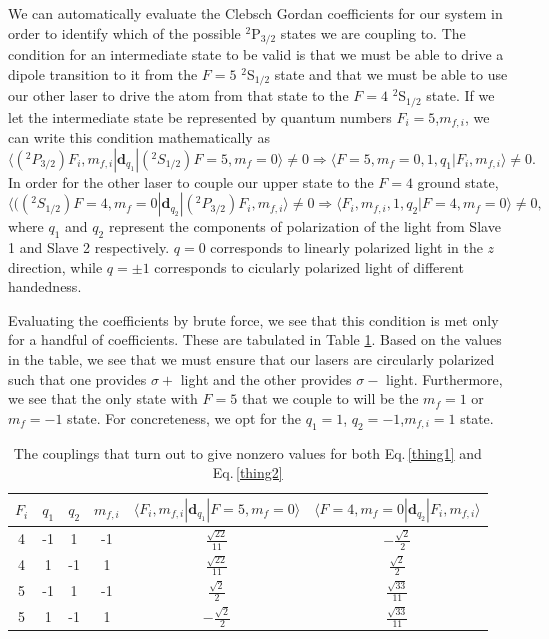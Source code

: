 We can automatically evaluate the Clebsch Gordan coefficients for our system in order to identify which of the possible $^2$P$_{3/2}$ states we are coupling to. The condition for an intermediate state to be valid is that we must be able to drive a dipole transition to it from the $F=5$ $^2$S$_{1/2}$ state and that we must be able to use our other laser to drive the atom from that state to the $F=4$ $^2$S$_{1/2}$ state. If we let the intermediate state be represented by quantum numbers $F_i=5$,$m_{f,i}$, we can write this condition mathematically as  
\begin{equation}
\langle (^2P_{3/2}) F_i,m_{f,i}|\mathbf{d}_{q_1}|(^2S_{1/2})F=5,m_f=0\rangle\neq 0 \Rightarrow \langle F=5,m_f=0,1,q_1|F_i,m_{f,i}\rangle \neq 0  \label{thing1}.
\end{equation}
In order for the other laser to couple our upper state to the $F=4$ ground state, 
\begin{equation}
\langle ((^2S_{1/2})F=4,m_f=0|\mathbf{d}_{q_2}|(^2P_{3/2}) F_i,m_{f,i}\rangle\neq 0 \Rightarrow \langle F_i,m_{f,i},1,q_2|F=4,m_f=0 \rangle \neq 0 \label{thing2},
\end{equation}
where $q_1$ and $q_2$ represent the components of polarization of the light from Slave 1 and Slave 2 respectively. $q=0$ corresponds to linearly polarized light in the $z$ direction, while $q=\pm 1$ corresponds to cicularly polarized light of different handedness.

Evaluating the coefficients by brute force, we see that this condition is met only for a handful of coefficients. These are tabulated in Table \ref{nonzeroCG}. Based on the values in the table, we see that we must ensure that our lasers are circularly polarized such that one provides $\sigma+$ light and the other provides $\sigma-$ light. Furthermore, we see that the only state with $F=5$ that we couple to will be the $m_f=1$ or $m_f=-1$ state. For concreteness, we opt for the $q_1=1$, $q_2=-1$,$m_{f,i}=1$ state. 

\begin{table}[h!]
\centering
\begin{tabular}{|c|c|c|c|c|c|}
$F_i$ & $q_1$ & $q_2$ & $m_{f,i}$ &$\langle  F_i,m_{f,i}|\mathbf{d}_{q_1}|F=5,m_f=0\rangle$&$\langle F=4,m_f=0|\mathbf{d}_{q_2}|F_i,m_{f,i}\rangle$ \\ 
\hline
4 & -1 & 1 & -1 &$ \frac{\sqrt{22}}{11} $&$ - \frac{\sqrt{2}}{2} $ \\ 
4 & 1 & -1 & 1 &$ \frac{\sqrt{22}}{11} $&$ \frac{\sqrt{2}}{2} $ \\ 
5 & -1 & 1 & -1 &$ \frac{\sqrt{2}}{2} $&$ \frac{\sqrt{33}}{11} $ \\ 
5 & 1 & -1 & 1 &$ - \frac{\sqrt{2}}{2} $&$ \frac{\sqrt{33}}{11} $ \\
\end{tabular}
\caption{The couplings that turn out to give nonzero values for both Eq.\,\ref{thing1} and Eq.\,\ref{thing2}}
\label{nonzeroCG}
\end{table}


